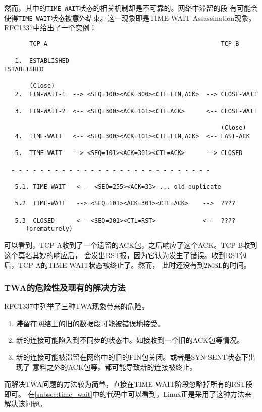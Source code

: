 然而，其中的\texttt{TIME_WAIT}状态的相关机制却是不可靠的。网络中滞留的段
有可能会使得\texttt{TIME_WAIT}状态被意外结束。这一现象即是TIME-WAIT 
Assassination现象。RFC1337中给出了一个实例：

\begin{verbatim}
       TCP A                                                TCP B

   1.  ESTABLISHED                                          ESTABLISHED

       (Close)
   2.  FIN-WAIT-1  --> <SEQ=100><ACK=300><CTL=FIN,ACK>  --> CLOSE-WAIT

   3.  FIN-WAIT-2  <-- <SEQ=300><ACK=101><CTL=ACK>      <-- CLOSE-WAIT

                                                            (Close)
   4.  TIME-WAIT   <-- <SEQ=300><ACK=101><CTL=FIN,ACK>  <-- LAST-ACK

   5.  TIME-WAIT   --> <SEQ=101><ACK=301><CTL=ACK>      --> CLOSED

  - - - - - - - - - - - - - - - - - - - - - - - - - - - -

   5.1. TIME-WAIT   <--  <SEQ=255><ACK=33> ... old duplicate

   5.2  TIME-WAIT   --> <SEQ=101><ACK=301><CTL=ACK>    -->  ????

   5.3  CLOSED      <-- <SEQ=301><CTL=RST>             <--  ????
      (prematurely)
\end{verbatim}
可以看到，TCP A收到了一个遗留的ACK包，之后响应了这个ACK。TCP B收到这个莫名其妙的响应后，
会发出RST报，因为它认为发生了错误。收到RST包后，TCP A的TIME-WAIT状态被终止了。然而，
此时还没有到2MSL的时间。

\subsubsection{TWA的危险性及现有的解决方法}
RFC1337中列举了三种TWA现象带来的危险。

\begin{enumerate}
\item 滞留在网络上的旧的数据段可能被错误地接受。
\item 新的连接可能陷入到不同步的状态中。如接收到一个旧的ACK包等情况。
\item 新的连接可能被滞留在网络中的旧的FIN包关闭。或者是SYN-SENT状态下出现了
意料之外的ACK包等。都可能导致新的连接被终止。
\end{enumerate}

而解决TWA问题的方法较为简单，直接在TIME-WAIT阶段忽略掉所有的RST段即可。
在\ref{subsec:time_wait}中的代码中可以看到，Linux正是采用了这种方法来解决该问题。
